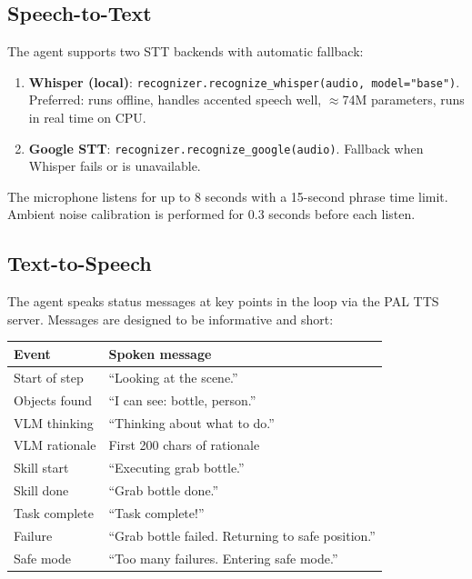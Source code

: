 \subsection{Speech-to-Text}

The agent supports two STT backends with automatic fallback:

\begin{enumerate}[noitemsep]
  \item \textbf{Whisper (local)}: \texttt{recognizer.recognize\_whisper(audio,
        model="base")}. Preferred: runs offline, handles accented speech well,
        $\approx$74M parameters, runs in real time on CPU.
  \item \textbf{Google STT}: \texttt{recognizer.recognize\_google(audio)}. Fallback
        when Whisper fails or is unavailable.
\end{enumerate}

The microphone listens for up to 8 seconds with a 15-second phrase time limit.
Ambient noise calibration is performed for 0.3 seconds before each listen.

\subsection{Text-to-Speech}

The agent speaks status messages at key points in the loop via the PAL TTS server.
Messages are designed to be informative and short:

\begin{center}
\begin{tabular}{ll}
\toprule
\textbf{Event} & \textbf{Spoken message} \\
\midrule
Start of step & ``Looking at the scene.'' \\
Objects found & ``I can see: bottle, person.'' \\
VLM thinking  & ``Thinking about what to do.'' \\
VLM rationale & First 200 chars of rationale \\
Skill start   & ``Executing grab bottle.'' \\
Skill done    & ``Grab bottle done.'' \\
Task complete & ``Task complete!'' \\
Failure       & ``Grab bottle failed. Returning to safe position.'' \\
Safe mode     & ``Too many failures. Entering safe mode.'' \\
\bottomrule
\end{tabular}
\end{center}

